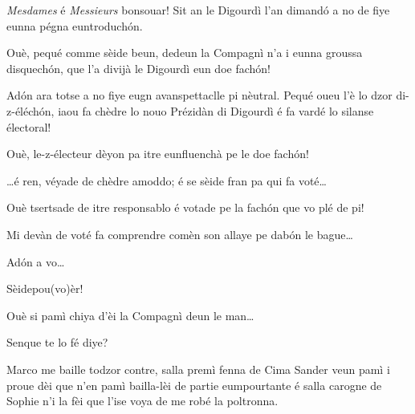 \begin{drama}

\Aimespeaks \textit{Mesdames} é \textit{Messieurs} bonsouar! Sit an le Digourdì l’an dimand\'o a no de fiye eunna pégna euntroduch\'on.

\Juliespeaks Ouè, pequé comme sèide beun, dedeun la Compagnì n’a i eunna groussa disquech\'on, que l'a divijà le Digourdì eun doe fach\'on!

\Aimespeaks Ad\'on ara totse a no fiye eugn avanspettaclle pi nèutral.  Pequé oueu l’è lo dzor di-z-éléch\'on, iaou fa chèdre lo nouo Prézidàn di Digourdì é fa vardé lo silanse électoral!

\Juliespeaks Ouè, le-z-électeur dèyon pa itre eunfluenchà pe le doe fach\'on! 


\Aimespeaks {} \ldots é ren, véyade de chèdre amoddo; é se sèide fran pa qui fa voté\ldots 


\Juliespeaks Ouè tsertsade de itre responsablo é votade pe la fach\'on  que vo plé de pi!

\Aimespeaks Mi devàn de voté fa comprendre comèn son allaye pe dab\'on le bague\ldots

\Juliespeaks Ad\'on a vo\ldots

\Tcheuttedouspeaks Sèidepou(vo)èr!

\act[Acte I]

\ridoiver





\Presidanspeaks {}
Ouè si pamì chiya d'èi la Compagnì
deun le man\ldots

\Secreteospeaks Senque te lo fé diye?

\Presidanspeaks Marco me baille todzor contre, salla premì fenna de Cima Sander veun pamì i proue dèi que n’en pamì bailla-lèi de partie eumpourtante é salla carogne de Sophie n'i la fèi que l'ise voya de me robé la poltronna.


\end{drama}
